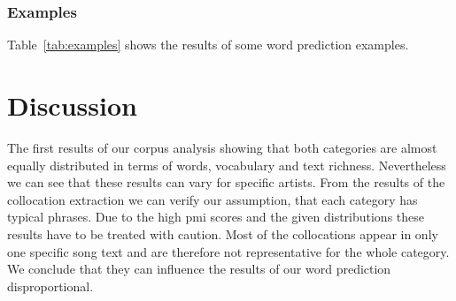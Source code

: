 \documentclass[a4paper,12pt]{article}
\begin{document}
\subsubsection{Examples}
Table~\ref{tab:examples} shows the results of some word prediction examples.\\
\begin{table}[]
\centering
{}
\caption{Examples for word prediction}
\label{tab:examples}
\end{table}

\section{Discussion}
The first results of our corpus analysis showing that both categories are almost equally distributed in terms of words, vocabulary and text richness. Nevertheless we can see that these results can vary for specific artists. From the results of the collocation extraction we can verify our assumption, that each category has typical phrases. Due to the high pmi scores and the given distributions these results have to be treated with caution. Most of the collocations appear in only one specific song text and are therefore not representative for the whole category. We conclude that they can influence the results of our word prediction disproportional.
\end{document}
